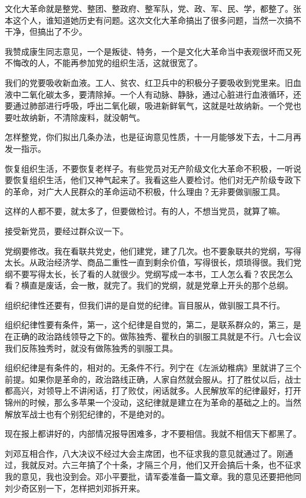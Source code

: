 文化大革命就是整党、整团、整政府、整军队，党、政、军、民、学，都整了。张本这个人，谁知道她历史有问题。这次文化大革命搞出了很多问题，当然一次搞不干净，但搞出了不少。

我赞成康生同志意见，一个是叛徒、特务，一个是文化大革命当中表观很坏而又死不悔改的人，不能再参加党的组织生活，这就很宽了。

我们的党要吸收新血液。工人、贫农、红卫兵中的积极分子要吸收到党里来。旧血液中二氧化碳太多，要清除掉。一个人有动脉、静脉，通过心脏进行血液循环，还要通过肺部进行呼吸，呼出二氧化碳，吸进新鲜氧气，这就是吐故纳新。一个党也要吐故纳新，不清除废料，就没朝气。

怎样整党，你们拟出几条办法，也是征询意见性质，十一月能够发下去，十二月再发一指示。

恢复组织生活，不要恢复老样子。有些党员对无产阶级文化大革命不积极，一听说要恢复组织生活，他们又神气起来了。我看这些人要检讨。他们对无产阶级专政下的革命，对广大人民群众的革命运动不积极，什么理由？无非要做驯服工具。

这样的人都不要，就太多了，但要做检讨。有的人，不想当党员，就算了嘛。

接受新党员，要经过群众议一下。

党纲要修改。我在看联共党史，他们建党，建了几次。也不要象联共的党纲，写得太长。从政治经济学、商品二重性一直到剩余价值，写得很长，烦琐得很。我们党纲不要写得太长，长了看的人就很少。党纲写成一本书，工人怎么看？农民怎么看？横直是废话，会一散，就完了。我们的党纲，就是党章上开头的那个总纲。

组织纪律性还要有，但我们讲的是自觉的纪律。盲目服从，做驯服工具不行。

组织纪律性要有条件，第一，这个纪律是自觉的，第二，是联系群众的，第三，是在正确的政治路线领导之下的。做陈独秀、瞿秋白的驯服工具就是不行。八七会议我们反陈独秀时，就没有做陈独秀的驯服工具。

组织纪律是有条件的，相对的。无条件不行。列宁在《左派幼稚病》里就讲了三个前提。如果你是革命的，政治路线正确，人家自然就会服从。打了胜仗以后，战士都高兴，对领导上不讲闲话，打了败仗，闲话就多。人民解放军的纪律最好，打开锦州的时候，那么多苹果一个没动，这纪律就是建立在为革命的基础之上的。当然解放军战士也有个别犯纪律的，不是绝对的。

现在报上都讲好的，内部情况报导困难多，才不要相信。我就不相信天下都黑了。

刘邓互相合作，八大决议不经过大会主席团，也不征求我的意见就通过了。刚通过，我就反对。六三年搞了个十条，才隔三个月，他们又开会搞后十条，也不征求我的意见，我也没到会。邓小平要批，请军委准备一篇文章。我的意见还要把他同刘少奇区别一下，怎样把刘邓拆开来。

